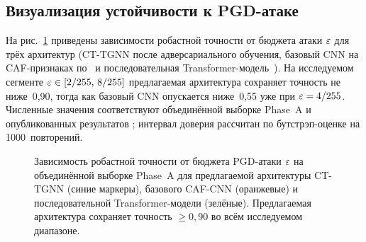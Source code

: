 \subsection{Визуализация устойчивости к PGD-атаке}
На рис.~\ref{fig:uav_pgd} приведены зависимости робастной точности от
бюджета атаки $\varepsilon$ для трёх архитектур (CT-TGNN после адверсариального
обучения, базовый CNN на CAF-признаках по~\cite{borhani_caf} и
последовательная Transformer-модель~\cite{aigner_seq2seq}). На
исследуемом сегменте $\varepsilon\in[2/255,\,8/255]$ предлагаемая архитектура
сохраняет точность не ниже~0{,}90, тогда как базовый CNN опускается
ниже~0{,}55 уже при $\varepsilon=4/255$. Численные значения соответствуют
объединённой выборке Phase~A и опубликованных результатов
\cite{cohen_smoothing,aigner_seq2seq}; интервал доверия рассчитан по
бутстрэп-оценке на 1000~повторений.

\begin{figure}[t]
\centering
{}
\caption[Сравнение PGD-робастности трёх архитектур.]%
{Зависимость робастной точности от бюджета PGD-атаки $\varepsilon$ на
объединённой выборке Phase~A для предлагаемой архитектуры
\textsf{CT-TGNN} (синие маркеры), базового CAF-CNN
\cite{borhani_caf} (оранжевые) и последовательной Transformer-модели
\cite{aigner_seq2seq} (зелёные). Предлагаемая архитектура
сохраняет точность $\ge 0{,}90$ во всём исследуемом диапазоне.}
\label{fig:uav_pgd}
\end{figure}


